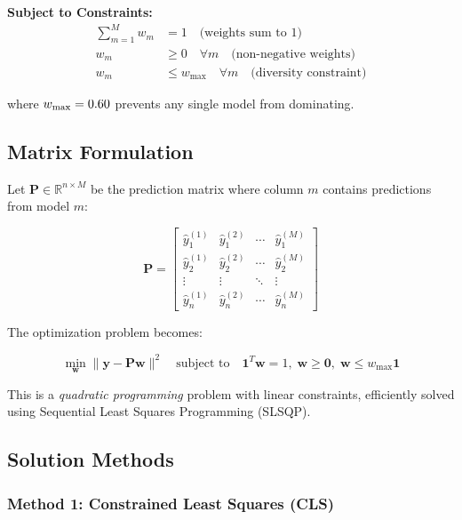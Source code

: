 \textbf{Subject to Constraints:}
\begin{align}
\sum_{m=1}^{M} w_m &= 1 \quad \text{(weights sum to 1)} \label{eq:sum_constraint}\\
w_m &\geq 0 \quad \forall m \quad \text{(non-negative weights)} \label{eq:nonneg_constraint}\\
w_m &\leq w_{\max} \quad \forall m \quad \text{(diversity constraint)} \label{eq:max_constraint}
\end{align}

where $w_{\max} = 0.60{}$ prevents any single model from dominating.

\subsection{Matrix Formulation}

Let $\mathbf{P} \in \mathbb{R}^{n \times M}$ be the prediction matrix where column $m$ contains predictions from model $m$:

\begin{equation}
\mathbf{P} = \begin{bmatrix}
\hat{y}_1^{(1)} & \hat{y}_1^{(2)} & \cdots & \hat{y}_1^{(M)} \\
\hat{y}_2^{(1)} & \hat{y}_2^{(2)} & \cdots & \hat{y}_2^{(M)} \\
\vdots & \vdots & \ddots & \vdots \\
\hat{y}_n^{(1)} & \hat{y}_n^{(2)} & \cdots & \hat{y}_n^{(M)}
\end{bmatrix}
\end{equation}

The optimization problem becomes:

\begin{equation}
\min_{\mathbf{w}} \|\mathbf{y} - \mathbf{P}\mathbf{w}\|^2 \quad \text{subject to} \quad \mathbf{1}^T\mathbf{w} = 1, \; \mathbf{w} \geq \mathbf{0}, \; \mathbf{w} \leq w_{\max}\mathbf{1}
\end{equation}

This is a \textit{quadratic programming} problem with linear constraints, efficiently solved using Sequential Least Squares Programming (SLSQP).

\subsection{Solution Methods}

\subsubsection{Method 1: Constrained Least Squares (CLS)}

